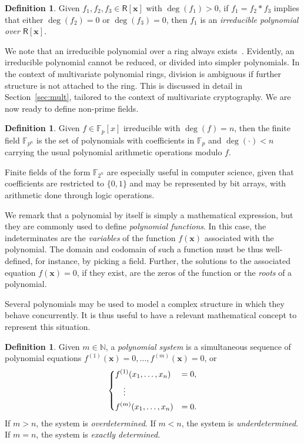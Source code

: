 \documentclass[12pt, a4paper, oneside]{memoir}
\theoremstyle{definition}
\newtheorem{definition}[theorem]{Definition}
\begin{document}
\begin{definition}
  Given $f_{1}, f_{2}, f_{3} \in \mathsf{R}[\mathbf{x}]$ with $\deg(f_{1}) > 0$, if $f_{1} = f_{2} \ast f_{3}$ implies that either $\deg(f_{2}) = 0$ or $\deg(f_{3}) = 0$, then $f_{1}$ is an \emph{irreducible polynomial over $\mathsf{R}[\mathbf{x}]$}.
\end{definition}

We note that an irreducible polynomial over a ring always exists~\cite[Remark 2.1.25]{Mullen:2013}. Evidently, an irreducible polynomial cannot be reduced, or divided into simpler polynomials. In the context of multivariate polynomial rings, division is ambiguous if further structure is not attached to the ring. This is discussed in detail in Section~\ref{sec:mult}, tailored to the context of multivariate cryptography. We are now ready to define non-prime fields.

\begin{definition}
  Given $f \in \mathbb{F}_{p}[x]$ irreducible with $\deg(f) = n$, then the finite field $\mathbb{F}_{p^{n}}$ is the set of polynomials with coefficients in $\mathbb{F}_{p}$ and $\deg(\cdot) < n$ carrying the usual polynomial arithmetic operations modulo $f$.
\end{definition}

Finite fields of the form $\mathbb{F}_{2^{n}}$ are especially useful in computer science, given that coefficients are restricted to $\{0, 1\}$ and may be represented by bit arrays, with arithmetic done through logic operations.

We remark that a polynomial by itself is simply a mathematical expression, but they are commonly used to define \emph{polynomial functions}. In this case, the indeterminates are the \emph{variables} of the function $f(\mathbf{x})$ associated with the polynomial. The domain and codomain of such a function must be thus well-defined, for instance, by picking a field. Further, the solutions to the associated equation $f(\mathbf{x}) = 0$, if they exist, are the zeros of the function or the \emph{roots} of a polynomial. 

Several polynomials may be used to model a complex structure in which they behave concurrently. It is thus useful to have a relevant mathematical concept to represent this situation.

\begin{definition}\label{def:poly-sys}
  Given $m \in \mathbb{N}$, a \emph{polynomial system} is a simultaneous sequence of polynomial equations $f^{(1)}(\mathbf{x}) = 0, \dots, f^{(m)}(\mathbf{x}) = 0$, or
  \begin{align}
    \begin{dcases}
      f^{(1)}(x_{1}, \dots, x_{n}) &= 0, \\
      \quad \vdots \\
      f^{(m)}(x_{1}, \dots, x_{n}) &= 0.
    \end{dcases}
  \end{align}
  If $m > n$, the system is \emph{overdetermined}. If $m < n$, the system is \emph{underdetermined}. If $m = n$, the system is \emph{exactly determined}.
\end{definition}
\end{document}
